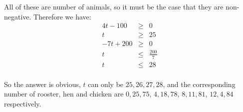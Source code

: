 \documentclass{article}
\begin{document}
All of these are number of animals, so it must be the case that they are non-negative. Therefore we have:
\begin{eqnarray*}
   4t - 100 &\geq& 0 \\
          t &\geq& 25 \\
  -7t + 200 &\geq& 0 \\
          t &\leq& \frac{200}{7} \\
          t &\leq& 28 \\
\end{eqnarray*}

So the answer is obvious, $ t $ can only be $ 25, 26, 27, 28 $, and the corresponding number of rooster, hen and chicken are $ 0, 25, 75 $, $ 4, 18, 78 $, $ 8, 11, 81 $, $ 12, 4, 84 $ respectively.
\end{document}
